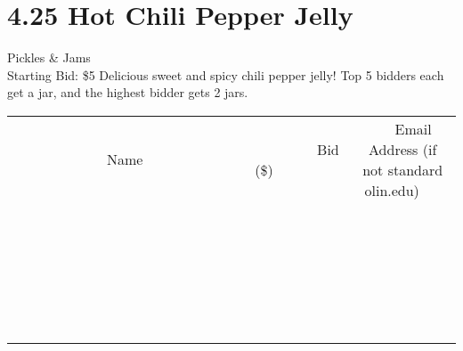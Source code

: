\documentclass[11pt]{article}
\begin{document}
\section*{4.25 Hot Chili Pepper Jelly}
Pickles \& Jams
\\
Starting Bid: \$5
\newline
Delicious sweet and spicy chili pepper jelly! Top 5 bidders each get a jar, and the highest bidder gets 2 jars.
\\[6ex]
\begin{tabular}{c c c}
~~~~~~~~~~~~~Name~~~~~~~~~~~~~ & ~~~~~~~~~Bid (\$)~~~~~~~~~  & ~~~Email Address (if not standard olin.edu)~~~\\
 & & \\
\hline
 & & \\
\hline
 & & \\
\hline
 & & \\
\hline
 & & \\
\hline
 & & \\
\hline
 & & \\
\hline
 & & \\
\hline
 & & \\
\hline
 & & \\
\hline
 & & \\
\hline
 & & \\
\hline
 & & \\
\hline
 & & \\
\hline
 & & \\
\hline
 & & \\
\hline
 & & \\
\hline
 & & \\
\hline
 & & \\
\hline
 & & \\
\hline
 & & \\
\hline
 & & \\
\hline
 & & \\
\hline
 & & \\
\hline
 & & \\
\hline
 & & \\
\hline
\end{tabular}
\newpage
\end{document}
